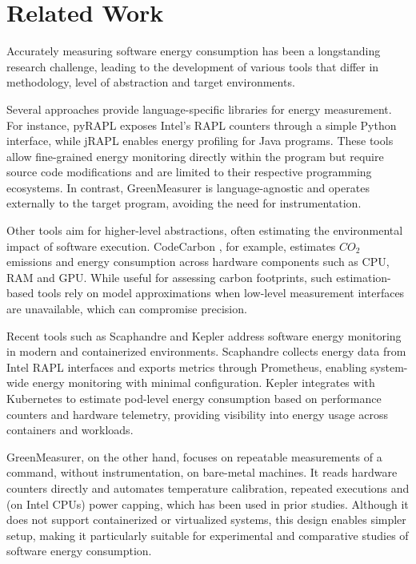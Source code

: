 \section{Related Work}
\label{rw_section}

Accurately measuring software energy consumption has been a longstanding research challenge, leading to the development of various tools that differ in methodology, level of abstraction and target environments.

Several approaches provide language-specific libraries for energy measurement. For instance, pyRAPL \cite{pyrapl} exposes Intel's RAPL counters through a simple Python interface, while jRAPL \cite{jRAPL} enables energy profiling for Java programs. These tools allow fine-grained energy monitoring directly within the program but require source code modifications and are limited to their respective programming ecosystems. In contrast, GreenMeasurer is language-agnostic and operates externally to the target program, avoiding the need for instrumentation.

Other tools aim for higher-level abstractions, often estimating the environmental impact of software execution. CodeCarbon \cite{benoit_courty_2024_11171501}, for example, estimates $CO_{2}$ emissions and energy consumption across hardware components such as CPU, RAM and GPU. While useful for assessing carbon footprints, such estimation-based tools rely on model approximations when low-level measurement interfaces are unavailable, which can compromise precision.

Recent tools such as Scaphandre \cite{Scaphandre} and Kepler \cite{10254956} address software energy monitoring in modern and containerized environments. Scaphandre collects energy data from Intel RAPL interfaces and exports metrics through Prometheus, enabling system-wide energy monitoring with minimal configuration. Kepler integrates with Kubernetes to estimate pod-level energy consumption based on performance counters and hardware telemetry, providing visibility into energy usage across containers and workloads.

GreenMeasurer, on the other hand, focuses on repeatable measurements of a command, without instrumentation, on bare-metal machines. It reads hardware counters directly and automates temperature calibration, repeated executions and (on Intel CPUs) power capping, which has been used in prior studies. Although it does not support containerized or virtualized systems, this design enables simpler setup, making it particularly suitable for experimental and comparative studies of software energy consumption.

